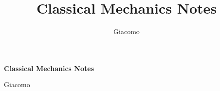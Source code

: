 \documentclass{article}
\title{Classical Mechanics Notes}
\author{Giacomo}
\begin{document}
\begin{titlepage}

    \centering
    {\Huge\bfseries Classical Mechanics Notes\par}
    \vspace{1.5cm}
    {\large Giacomo\par}
\end{titlepage}





\end{document}
